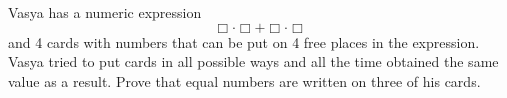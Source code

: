 Vasya has a numeric expression
$$ \Box \cdot \Box +\Box \cdot \Box $$and 4 cards with numbers that can be put on 4 free places in the expression. Vasya tried to put cards in all possible ways and all the time obtained the same value as a result. Prove that equal numbers are written on three of his cards.